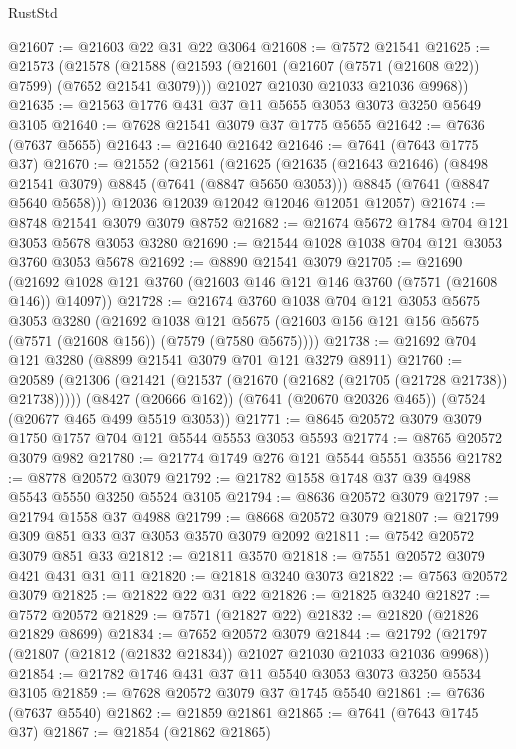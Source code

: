 \begin{lexlean}{RustStd}
\begin{coremodule}
{\begin{coremodule}
{{{{{{{{{{{{{{{{{{{{{{{{{{{{{{{{@21607 := @21603 @22 @31 @22 @3064
@21608 := @7572 @21541
@21625 := @21573
    (@21578
      (@21588
        (@21593 (@21601 (@21607 (@7571 (@21608 @22)) @7599) (@7652 @21541 @3079)))
        @21027
        @21030
        @21033
        @21036
        @9968))
@21635 := @21563 @1776 @431 @37 @11 @5655 @3053 @3073 @3250 @5649 @3105
@21640 := @7628 @21541 @3079 @37 @1775 @5655
@21642 := @7636 (@7637 @5655)
@21643 := @21640 @21642
@21646 := @7641 (@7643 @1775 @37)
@21670 := @21552
    (@21561
      (@21625
        (@21635 (@21643 @21646) (@8498 @21541 @3079) @8845 (@7641 (@8847 @5650 @3053)))
        @8845
        (@7641 (@8847 @5640 @5658)))
      @12036
      @12039
      @12042
      @12046
      @12051
      @12057)
@21674 := @8748 @21541 @3079 @3079 @8752
@21682 := @21674 @5672 @1784 @704 @121 @3053 @5678 @3053 @3280
@21690 := @21544 @1028 @1038 @704 @121 @3053 @3760 @3053 @5678
@21692 := @8890 @21541 @3079
@21705 := @21690
    (@21692 @1028 @121 @3760 (@21603 @146 @121 @146 @3760 (@7571 (@21608 @146)) @14097))
@21728 := @21674
    @3760
    @1038
    @704
    @121
    @3053
    @5675
    @3053
    @3280
    (@21692
      @1038
      @121
      @5675
      (@21603 @156 @121 @156 @5675 (@7571 (@21608 @156)) (@7579 (@7580 @5675))))
@21738 := @21692 @704 @121 @3280 (@8899 @21541 @3079 @701 @121 @3279 @8911)
@21760 := @20589
    (@21306 (@21421 (@21537 (@21670 (@21682 (@21705 (@21728 @21738)) @21738)))))
    (@8427 (@20666 @162))
    (@7641 (@20670 @20326 @465))
    (@7524 (@20677 @465 @499 @5519 @3053))
@21771 := @8645 @20572 @3079 @3079 @1750 @1757 @704 @121 @5544 @5553 @3053 @5593
@21774 := @8765 @20572 @3079 @982
@21780 := @21774 @1749 @276 @121 @5544 @5551 @3556
@21782 := @8778 @20572 @3079
@21792 := @21782 @1558 @1748 @37 @39 @4988 @5543 @5550 @3250 @5524 @3105
@21794 := @8636 @20572 @3079
@21797 := @21794 @1558 @37 @4988
@21799 := @8668 @20572 @3079
@21807 := @21799 @309 @851 @33 @37 @3053 @3570 @3079 @2092
@21811 := @7542 @20572 @3079 @851 @33
@21812 := @21811 @3570
@21818 := @7551 @20572 @3079 @421 @431 @31 @11
@21820 := @21818 @3240 @3073
@21822 := @7563 @20572 @3079
@21825 := @21822 @22 @31 @22
@21826 := @21825 @3240
@21827 := @7572 @20572
@21829 := @7571 (@21827 @22)
@21832 := @21820 (@21826 @21829 @8699)
@21834 := @7652 @20572 @3079
@21844 := @21792 (@21797 (@21807 (@21812 (@21832 @21834)) @21027 @21030 @21033 @21036 @9968))
@21854 := @21782 @1746 @431 @37 @11 @5540 @3053 @3073 @3250 @5534 @3105
@21859 := @7628 @20572 @3079 @37 @1745 @5540
@21861 := @7636 (@7637 @5540)
@21862 := @21859 @21861
@21865 := @7641 (@7643 @1745 @37)
@21867 := @21854 (@21862 @21865)
}}}}}}}}}}}}}}}}}}}}}}}}}}}}}}}}
\end{coremodule}}
\end{coremodule}
\end{lexlean}

